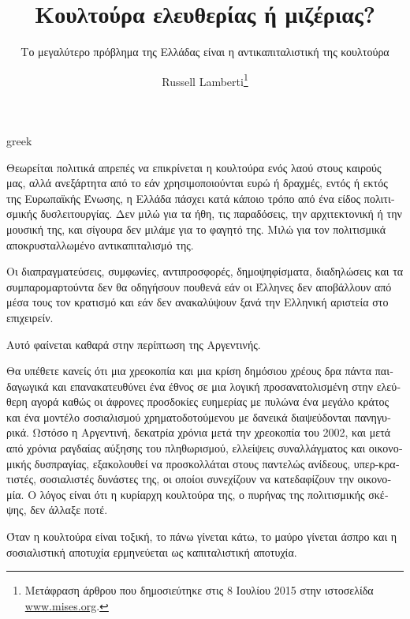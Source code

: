 \documentclass[11pt, twocolumn]{scrartcl}
\begin{document}
\begin{otherlanguage}{greek}
\title{Κουλτούρα ελευθερίας ή μιζέριας?}
\subtitle{Το μεγαλύτερο πρόβλημα της Ελλάδας είναι η αντικαπιταλιστική της κουλτούρα}


\begin{hyphenrules}{greek}
\end{hyphenrules}

\author{\latintext Russell Lamberti\footnote{Μετάφραση άρθρου που δημοσιεύτηκε στις 8 Ιουλίου 2015 στην ιστοσελίδα
\latintext \url{www.mises.org}.}}
\date{}
\maketitle

Θεωρείται πολιτικά απρεπές να επικρίνεται η κουλτούρα ενός λαού στους καιρούς μας, αλλά ανεξάρτητα από το εάν χρησιμοποιούνται ευρώ ή δραχμές, εντός ή εκτός της Ευρωπαϊκής Ένωσης, η Ελλάδα πάσχει κατά κάποιο τρόπο από ένα είδος πολιτισμικής δυσλειτουργίας. 
Δεν μιλώ για τα ήθη, τις παραδόσεις, την αρχιτεκτονική ή την μουσική της, και σίγουρα δεν μιλάμε για το φαγητό της. Μιλώ για τον πολιτισμικά αποκρυσταλλωμένο αντικαπιταλισμό της.

Οι διαπραγματεύσεις, συμφωνίες, αντιπροσφορές, δημοψηφίσματα, διαδηλώσεις και τα συμπαρομαρτούντα δεν θα οδηγήσουν πουθενά εάν οι Έλληνες δεν αποβάλλουν από μέσα τους τον κρατισμό και εάν δεν ανακαλύψουν ξανά την Ελληνική αριστεία στο επιχειρείν.

Αυτό φαίνεται καθαρά στην περίπτωση της Αργεντινής.

Θα υπέθετε κανείς ότι μια χρεοκοπία και μια κρίση δημόσιου χρέους δρα πάντα παιδαγωγικά και επανακατευθύνει ένα έθνος σε μια λογική προσανατολισμένη στην ελεύθερη αγορά καθώς οι άφρονες προσδοκίες ευημερίας με πυλώνα ένα μεγάλο κράτος και ένα μοντέλο σοσιαλισμού χρηματοδοτούμενου με δανεικά διαψεύδονται πανηγυρικά.
Ωστόσο η Αργεντινή, δεκατρία χρόνια μετά την χρεοκοπία του 2002, και μετά από χρόνια ραγδαίας αύξησης του πληθωρισμού, ελλείψεις συναλλάγματος και οικονομικής δυσπραγίας, εξακολουθεί να προσκολλάται στους παντελώς ανίδεους, υπερ-κρατιστές, σοσιαλιστές δυνάστες της, οι οποίοι συνεχίζουν να κατεδαφίζουν την οικονομία. 
Ο λόγος είναι ότι η κυρίαρχη κουλτούρα της, ο πυρήνας της πολιτισμικής σκέψης, δεν άλλαξε ποτέ.

Όταν η κουλτούρα είναι τοξική, το πάνω γίνεται κάτω, το μαύρο γίνεται άσπρο και η σοσιαλιστική αποτυχία ερμηνεύεται ως καπιταλιστική αποτυχία.


\end{otherlanguage}
\end{document}
